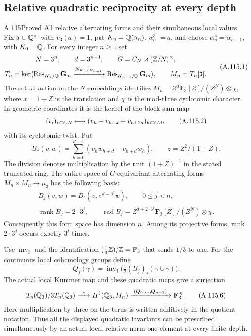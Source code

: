 \subsection{Relative quadratic reciprocity at every depth}

\begin{statement}{A.115}{Proved}
{All relative alternating forms and their simultaneous local values}
Fix $a\in\mathbb Q^\times$ with $v_3(a)=1$, put
$K_n=\mathbb Q(\alpha_n)$, $\alpha_n^{3^n}=a$, and choose
$\alpha_n^3=\alpha_{n-1}$, with $K_0=\mathbb Q$.
For every integer $n\geq1$ set
\[
 \begin{gathered}
 N=3^n,\qquad d=3^{n-1},\qquad
 G=C_N\rtimes(\mathbb Z/N)^\times,\\
 T_n=\ker\bigl(\operatorname{Res}_{K_n/\mathbb Q}\mathbf G_m
       \xrightarrow{N_{K_n/K_{n-1}}}
                  \operatorname{Res}_{K_{n-1}/\mathbb Q}\mathbf G_m\bigr),
 \qquad M_n=T_n[3].
 \end{gathered}
\tag{A.115.1}
\]
The actual action on the $N$ embeddings identifies
$M_n=Z^d\mathbf F_3[Z]/(Z^N)\otimes\chi$, where
$x=1+Z$ is the translation and $\chi$ is the mod-three
cyclotomic character.  In geometric coordinates it is
the kernel of the block-sum map
\[
 (v_i)_{i\in\mathbb Z/N}\longmapsto
       (v_h+v_{h+d}+v_{h+2d})_{h\in\mathbb Z/d},
\tag{A.115.2}
\]
with its cyclotomic twist.  Put
\[
 B_*(v,w)=\sum_{h=0}^{d-1}
       (v_h w_{h+d}-v_{h+d}w_h),\qquad
                 z=Z^2/(1+Z).
\tag{A.115.3}
\]
The division denotes multiplication by the unit
$(1+Z)^{-1}$ in the stated truncated ring.
The entire space of $G$-equivariant alternating
forms $M_n\times M_n\to\mu_3$ has the following basis:
\[
 \begin{gathered}
 B_j(v,w)=B_*(v,z^{\,d-3^j}w),\qquad 0\leq j<n,\\
 \operatorname{rank}B_j=2\cdot3^j,\qquad
 \operatorname{rad}B_j=Z^{d+2\cdot3^j}
                      \mathbf F_3[Z]/(Z^N)\otimes\chi.
 \end{gathered}
\tag{A.115.4}
\]
Consequently this form space has dimension $n$.
Among its projective forms, rank $2\cdot3^j$
occurs exactly $3^j$ times.

Use $\operatorname{inv}_3$ and the identification
$(\tfrac13\mathbb Z)/\mathbb Z=\mathbf F_3$ that sends $1/3$ to one.
For the continuous local cohomology groups define
\[
 Q_j(\gamma)=\operatorname{inv}_3
       \bigl(\tfrac12(B_j)_*(\gamma\cup\gamma)\bigr).
\tag{A.115.5}
\]
The actual local Kummer map and these quadratic maps
give a surjection
\[
 T_n(\mathbb Q_3)/3T_n(\mathbb Q_3)
   \xrightarrow{\ \sim\ }H^1(\mathbb Q_3,M_n)
   \xrightarrow{\ (Q_0,\ldots,Q_{n-1})\ }
                         \mathbf F_3^{\,n}.
\tag{A.115.6}
\]
Here multiplication by three on the torus is written
additively in the quotient notation.  Thus all the
displayed quadratic invariants can be prescribed
simultaneously by an actual local relative norm-one
element at every finite depth.
\end{statement}
